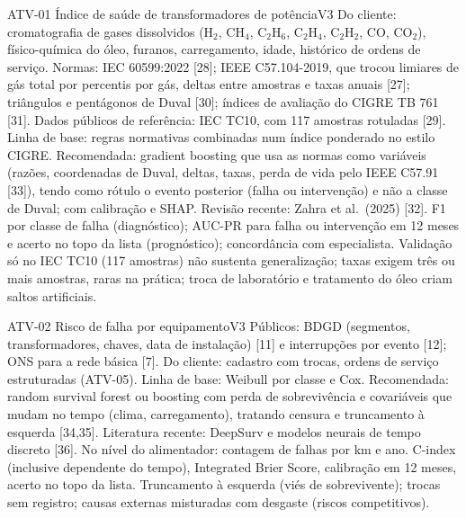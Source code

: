 \begin{ficha}{ATV-01 \textperiodcentered{} Índice de saúde de transformadores de potência}{V3}
 Do cliente: cromatografia de gases dissolvidos (H$_2$, CH$_4$,
C$_2$H$_6$, C$_2$H$_4$, C$_2$H$_2$, CO, CO$_2$), físico-química do óleo,
furanos, carregamento, idade, histórico de ordens de serviço. Normas: IEC
60599:2022 [28]; IEEE C57.104-2019, que trocou limiares de gás total por
percentis por gás, deltas entre amostras e taxas anuais [27]; triângulos e
pentágonos de Duval [30]; índices de avaliação do CIGRE TB 761 [31]. Dados
públicos de referência: IEC TC10, com 117 amostras rotuladas [29].
 Linha de base: regras normativas combinadas num índice
ponderado no estilo CIGRE. Recomendada: gradient boosting que usa as normas
como variáveis (razões, coordenadas de Duval, deltas, taxas, perda de vida
pelo IEEE C57.91 [33]), tendo como rótulo o evento posterior (falha ou
intervenção) e não a classe de Duval; com calibração e SHAP. Revisão recente:
Zahra et al.\ (2025) [32].
 F1 por classe de falha (diagnóstico); AUC-PR para falha ou
intervenção em 12 meses e acerto no topo da lista (prognóstico); concordância
com especialista.
 Validação só no IEC TC10 (117 amostras) não sustenta
generalização;
taxas exigem três ou mais amostras, raras na prática; troca de laboratório e
tratamento do óleo criam saltos artificiais.
\end{ficha}

\begin{ficha}{ATV-02 \textperiodcentered{} Risco de falha por equipamento}{V3}
 Públicos: BDGD (segmentos, transformadores, chaves, data de
instalação) [11] e interrupções por evento [12]; ONS para a rede básica [7].
Do cliente: cadastro com trocas, ordens de serviço estruturadas (ATV-05).
 Linha de base: Weibull por classe e Cox. Recomendada:
random survival forest ou boosting com perda de sobrevivência e covariáveis
que mudam no tempo (clima, carregamento), tratando censura e truncamento à
esquerda [34,35]. Literatura recente: DeepSurv e modelos neurais de tempo
discreto [36]. No nível do alimentador: contagem de falhas por km e ano.
 C-index (inclusive dependente do tempo), Integrated Brier
Score, calibração em 12 meses, acerto no topo da lista.
 Truncamento à esquerda (viés de sobrevivente); trocas sem
registro; causas externas misturadas com desgaste (riscos competitivos).
\end{ficha}

